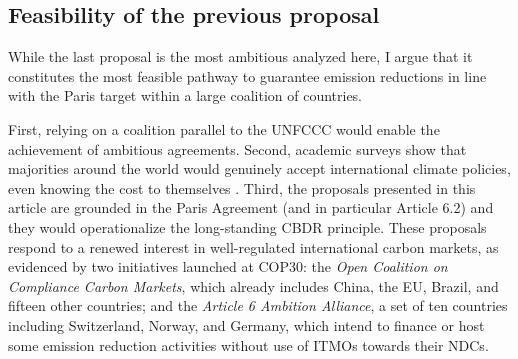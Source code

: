 \documentclass[12pt,english]{article}
\begin{document}

\subsection{Feasibility of the previous proposal\label{subsec:feasibility}}

While the last proposal is the most ambitious analyzed here, I argue that it constitutes the most feasible pathway to guarantee emission reductions in line with the Paris target within a large coalition of countries. 

First, relying on a coalition parallel to the UNFCCC would enable the achievement of ambitious agreements. %
Second, %
academic surveys show that majorities around the world would genuinely accept international climate policies, even knowing the cost to themselves \citep{fabre_majority_2025,fabre_public_2025,andre_globally_2024}. %
Third, the proposals presented in this article are grounded in the Paris Agreement (and in particular Article 6.2) and they would operationalize the long-standing CBDR principle. These proposals respond to a renewed interest in well-regulated international carbon markets, as evidenced by two initiatives launched at COP30: the \textit{Open Coalition on Compliance Carbon Markets}, which already includes China, the EU, Brazil, and fifteen other countries; and the \textit{Article 6 Ambition Alliance}, a set of ten countries including Switzerland, Norway, and Germany, which intend to finance or host some emission reduction activities without use of ITMOs towards their NDCs.
\end{document}
